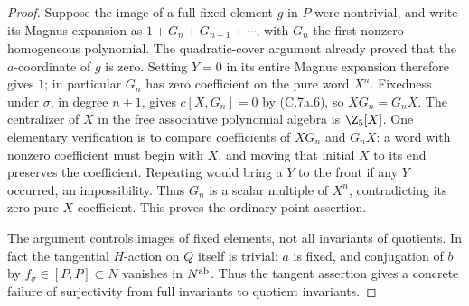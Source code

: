 \begin{proof}
Suppose the image of a full fixed element $g$ in $P$ were nontrivial,
and write its Magnus expansion as $1+G_n+G_{n+1}+\cdots$, with $G_n$
the first nonzero homogeneous polynomial. The quadratic-cover argument
already proved that the $a$-coordinate of $g$ is zero. Setting $Y=0$ in
its entire Magnus expansion therefore gives $1$; in particular $G_n$
has zero coefficient on the pure word $X^n$. Fixedness under $\sigma$,
in degree $n+1$, gives $c[X,G_n]=0$ by (C.7a.6), so $XG_n=G_nX$.
The centralizer of $X$ in the free associative polynomial algebra is
$\Z_5[X]$. One elementary verification is to compare coefficients of
$XG_n$ and $G_nX$: a word with nonzero coefficient must begin with $X$,
and moving that initial $X$ to its end preserves the coefficient.
Repeating would bring a $Y$ to the front if any $Y$ occurred, an
impossibility. Thus $G_n$ is a scalar multiple of $X^n$, contradicting
its zero pure-$X$ coefficient. This proves the ordinary-point assertion.

The argument controls images of fixed elements, not all invariants of
quotients. In fact the tangential $H$-action on $Q$ itself is trivial:
$a$ is fixed, and conjugation of $b$ by $f_\sigma\in[P,P]\subset N$
vanishes in $N^{\rm ab}$. Thus the tangent assertion gives a concrete
failure of surjectivity from full invariants to quotient invariants.
\end{proof}
